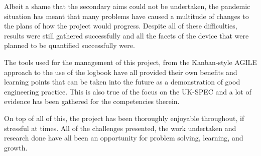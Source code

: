 Albeit a shame that the secondary aims could not be undertaken, the pandemic situation has meant that many problems have caused a multitude of changes to the plans of how the project would progress. Despite all of these difficulties, results were still gathered successfully and all the facets of the device that were planned to be quantified successfully were.

The tools used for the management of this project, from the Kanban-style AGILE approach to the use of the logbook have all provided their own benefits and learning points that can be taken into the future as a demonstration of good engineering practice. This is also true of the focus on the  UK-SPEC and a lot of evidence has been gathered for the competencies therein.

On top of all of this, the project has been thoroughly enjoyable throughout, if stressful at times. All of the challenges presented, the work undertaken and research done have all been an opportunity for problem solving, learning, and growth.

